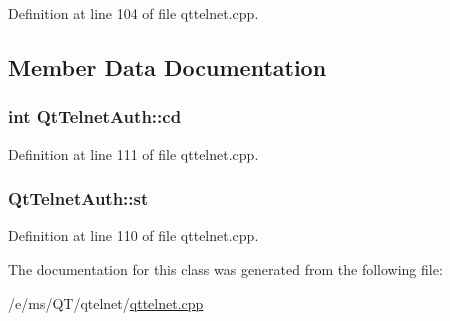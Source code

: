 Definition at line 104 of file qttelnet.cpp.



\subsection{Member Data Documentation}
\hypertarget{classQtTelnetAuth_a708030f5805da6a12876c6cbab24dacc}{
\subsubsection[{cd}]{\setlength{\rightskip}{0pt plus 5cm}int {\bf QtTelnetAuth::cd}}}
\label{classQtTelnetAuth_a708030f5805da6a12876c6cbab24dacc}


Definition at line 111 of file qttelnet.cpp.

\hypertarget{classQtTelnetAuth_a38da91878419c68ec79384b5d75b3908}{
\subsubsection[{st}]{ {\bf QtTelnetAuth::st}}}
\label{classQtTelnetAuth_a38da91878419c68ec79384b5d75b3908}


Definition at line 110 of file qttelnet.cpp.



The documentation for this class was generated from the following file:\begin{DoxyCompactItemize}
\item 
/e/ms/QT/qtelnet/\hyperlink{qttelnet_8cpp}{qttelnet.cpp}\end{DoxyCompactItemize}
